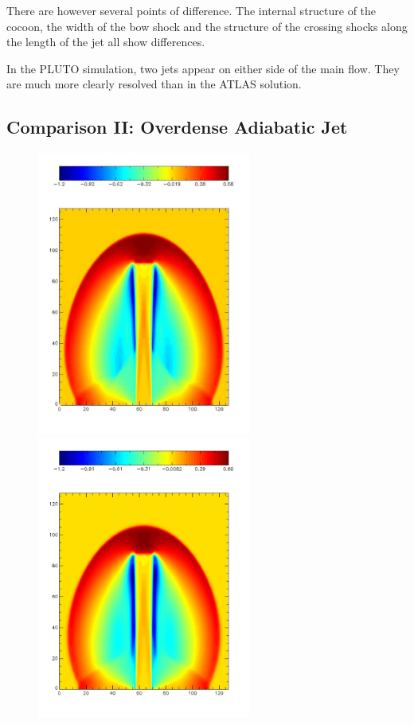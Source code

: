 There are however several points of difference. The internal structure of the cocoon, the width of the bow shock and the structure of the crossing shocks along the length of the jet all show differences.

In the PLUTO simulation, two jets appear on either side of the main flow. They are much more clearly resolved than in the ATLAS solution.




\subsection{Comparison II: Overdense Adiabatic Jet}

\begin{figure}[t]
\begin{center}
\begin{minipage}[c]{.48\linewidth}
\includegraphics[width=7cm]{atlas_mach10_eta1}
\end{minipage} \hfill
\begin{minipage}[c]{.48\linewidth}
\includegraphics[width=7cm]{pluto_mach_10_eta_1}

\end{minipage}
\end{center}
\end{figure}
